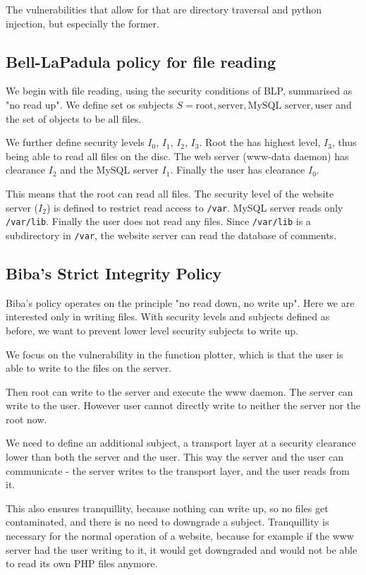 \documentclass[11pt,journal]{article}
\begin{document}
	The vulnerabilities that allow for that are directory traversal and python injection, but especially the former.
	
	\subsection{Bell-LaPadula policy for file reading}
	We begin with file reading, using the security conditions of BLP, summarised as "no read up". We define set os subjects $S = {\text{root}, \text{server}, \text{MySQL server}, \text{user}}$ and the set of objects to be all files.
	
	We further define security levels $I_0$, $I_1$, $I_2$, $I_3$. Root the has highest level, $I_3$, thus being able to read all files on the disc. The web server (www-data daemon) has clearance $I_2$ and the MySQL server $I_1$. Finally the user has clearance $I_0$. 
	
	This means that the root can read all files. The security level of the website server ($I_2$) is defined to restrict read access to \texttt{/var}. MySQL server reads only \texttt{/var/lib}. Finally the user does not read any files. Since \texttt{/var/lib} is a subdirectory in \texttt{/var}, the website server can read the database of comments.
	
	\subsection{Biba's Strict Integrity Policy}
	
	Biba's policy operates on the principle "no read down, no write up". Here we are interested only in writing files. With security levels and subjects defined as before, we want to prevent lower level security subjects to write up.
	
	We focus on the vulnerability in the function plotter, which is that the user is able to write to the files on the server.
	
	Then root can write to the server and execute the www daemon. The server can write to the user. However user cannot directly write to neither the server nor the root now.
	
	We need to define an additional subject, a transport layer at a security clearance lower than both the server and the user. This way the server and the user can communicate - the server writes to the transport layer, and the user reads from it.
	
	This also ensures tranquillity, because nothing can write up, so no files get contaminated, and there is no need to downgrade a subject. Tranquillity is necessary for the normal operation of a website, because for example if the www server had the user writing to it, it would get downgraded and would not be able to read its own PHP files anymore.
	
\end{document}
